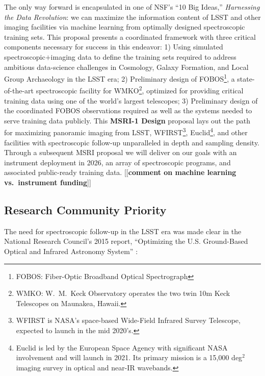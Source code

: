 \documentclass[oneside,11pt]{amsart}
\newcommand{\comment}[2][todo]{{\color{#1}[[{\bf #2}]]}}
\begin{document}
The only way forward is encapsulated in one of NSF's ``10 Big Ideas,''
\emph{Harnessing the Data Revolution}: we can maximize the information
content of LSST and other imaging facilities via machine learning from
optimally designed spectroscopic training sets.  This proposal presents
a coordinated framework with three critical components necessary for
success in this endeavor: 1) Using simulated spectroscopic$+$imaging
data to define the training sets required to address ambitious
data-science challenges in Cosmology, Galaxy Formation, and Local Group
Archaeology in the LSST era; 2) Preliminary design of
FOBOS\footnote{FOBOS: Fiber-Optic Broadband Optical Spectrograph}, a
state-of-the-art spectroscopic facility for WMKO\footnote{WMKO: W.~M.\ Keck Observatory operates the two twin 10m Keck Telescopes on
Maunakea, Hawaii.}, optimized for providing critical training data using
one of the world's largest telescopes; 3) Preliminary design of the
coordinated FOBOS observations required as well as the systems needed to
serve training data publicly.  This {\bf MSRI-1 Design} proposal lays
out the path for maximizing panoramic imaging from LSST,
WFIRST\footnote{WFIRST is NASA's space-based Wide-Field Infrared Survey
Telescope, expected to launch in the mid 2020's.},
Euclid\footnote{Euclid is led by the European Space Agency with
significant NASA involvement and will launch in 2021. Its primary
mission is a 15,000 deg$^2$ imaging survey in optical and near-IR
wavebands.}, and other facilities with spectroscopic follow-up
unparalleled in depth and sampling density.  Through a subsequent MSRI
proposal we will deliver on our goals with an instrument deployment in
2026, an array of spectroscopic programs, and associated public-ready
training data.  \comment{comment on machine learning vs.\ instrument
funding}

\subsection{Research Community Priority} 
\label{sec:community}

The need for spectroscopic follow-up in the LSST era was made clear in
the National Research Council's 2015 report, ``Optimizing the U.S.
Ground-Based Optical and Infrared Astronomy System'' \citep{NAP21722}:
%
\noindent{}
\end{document}
